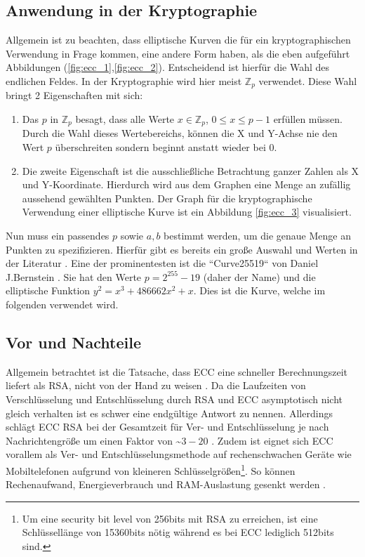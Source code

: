 \documentclass[11pt,a4paper]{scrreprt}
\begin{document}
\subsection{Anwendung in der Kryptographie}
Allgemein ist zu beachten, dass elliptische Kurven die für ein kryptographischen Verwendung in Frage kommen, eine andere Form haben, als die eben aufgeführt Abbildungen (\ref{fig:ecc_1},\ref{fig:ecc_2}). Entscheidend ist hierfür die Wahl des endlichen Feldes. In der Kryptographie wird hier meist $\mathbb{Z}_p$ verwendet. Diese Wahl bringt 2 Eigenschaften mit sich:
\begin{enumerate}
    \item Das $p$ in $\mathbb{Z}_p$ besagt, dass alle Werte $x \in \mathbb{Z}_p$, $0 \leq x \leq p-1$ erfüllen müssen. Durch die Wahl dieses Wertebereichs, können die X und Y-Achse nie den Wert $p$ überschreiten sondern beginnt anstatt wieder bei 0.
    \item Die zweite Eigenschaft ist die ausschließliche Betrachtung ganzer Zahlen als X und Y-Koordinate. Hierdurch wird aus dem Graphen eine Menge an zufällig aussehend gewählten Punkten. Der Graph für die kryptographische Verwendung einer elliptische Kurve ist ein Abbildung \ref{fig:ecc_3} visualisiert.
\end{enumerate}
Nun muss ein passendes $p$ sowie $a,b$ bestimmt werden, um die genaue Menge an Punkten zu spezifizieren. Hierfür gibt es bereits ein große Auswahl und Werten in der Literatur \cite{ecc-lochter2010elliptic}\cite{ecc-merkle2013elliptic}. Eine der prominentesten ist die ``Curve25519`` von Daniel J.Bernstein \cite{ecc-bernstein2006curve25519}. Sie hat den Werte $p=2^{255}-19$ (daher der Name) und die elliptische Funktion  $y^2=x^3+486662x^2+x$. Dies ist die Kurve, welche im folgenden verwendet wird.


\subsection{Vor und Nachteile}
Allgemein betrachtet ist die Tatsache, dass ECC eine schneller Berechnungszeit liefert als RSA, nicht von der Hand zu weisen \cite{ecc-cloud2013elliptic}. Da die Laufzeiten von Verschlüsselung und Entschlüsselung durch RSA und ECC asymptotisch nicht gleich verhalten ist es schwer eine endgültige Antwort zu nennen. Allerdings schlägt ECC RSA bei der Gesamtzeit für Ver- und Entschlüsselung je nach Nachrichtengröße um einen Faktor von \textasciitilde $3-20$ \cite{ecc-mahto2018performance}\cite{ecc-bao2022research}. Zudem ist eignet sich ECC vorallem als Ver- und Entschlüsselungsmethode auf rechenschwachen Geräte wie Mobiltelefonen aufgrund von kleineren Schlüsselgrößen\footnote{Um eine security bit level von 256bits mit RSA zu erreichen, ist eine Schlüssellänge von 15360bits nötig während es bei ECC lediglich 512bits sind.\cite{ecc-mahto2018performance}}. So können Rechenaufwand, Energieverbrauch und RAM-Auslastung gesenkt werden \cite{ecc-gupta2011ecc}.
\end{document}
